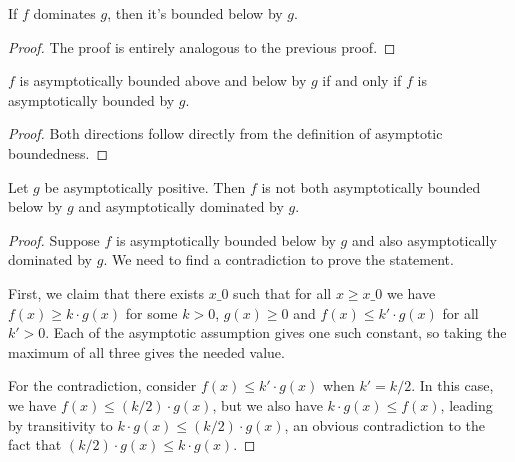 \begin{lemma}
    \label{lemma:asymp_bounded_below_of_left_dom}
    \leanok
    If $f$ dominates $g$, then it's bounded below by $g$.
\end{lemma}

\begin{proof}
    \leanok
    The proof is entirely analogous to the previous proof.
\end{proof}

\begin{lemma}
    \label{lemma:asymp_bounded_above_below_iff}
    \leanok
    $f$ is asymptotically bounded above and below by $g$ if and only if $f$ is 
    asymptotically bounded by $g$.
\end{lemma}

\begin{proof}
    \leanok
    Both directions follow directly from the definition of asymptotic boundedness. 
\end{proof}

\begin{lemma}
    \label{lemma:not_asymp_pos_bounded_below_and_right_dom}
    \leanok
    Let $g$ be asymptotically positive. Then $f$ is not both asymptotically bounded 
    below by $g$ and asymptotically dominated by $g$.
\end{lemma}

\begin{proof}
    \leanok
    Suppose $f$ is asymptotically bounded below by $g$ and also asymptotically dominated
    by $g$. We need to find a contradiction to prove the statement. 

    First, we claim that there exists $x\_0$ such that for all $x \ge x\_0$ we have 
    $f(x) \ge k \cdot g(x)$ for some $k > 0$, $g(x) \ge 0$ and $f(x) \le k' \cdot g(x)$ 
    for all $k' > 0$. Each of the asymptotic assumption gives one such constant, so
    taking the maximum of all three gives the needed value.

    For the contradiction, consider $f(x) \le k' \cdot g(x)$ when $k' = k / 2$.
    In this case, we have $f(x) \le (k / 2) \cdot g(x)$, but we also have
    $k \cdot g(x) \le f(x)$, leading by transitivity to $k \cdot g(x) \le (k / 2) \cdot g(x)$,
    an obvious contradiction to the fact that $(k / 2) \cdot g(x) \le k \cdot g(x)$.
\end{proof}

